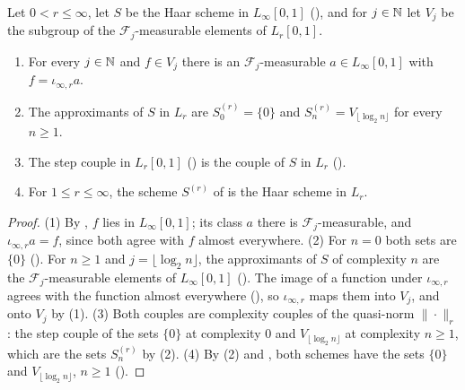 \begin{lemma}
\label{lem:steps-function-scheme}
\leanok
{}
Let $0 < r \leq \infty$, let $S$ be the Haar scheme in $L_\infty[0, 1]$
(), and for $j \in \mathbb{N}$ let $V_j$ be the subgroup of the
$\mathcal{F}_j$-measurable elements of $L_r[0, 1]$.
\begin{enumerate}
  \item For every $j \in \mathbb{N}$ and $f \in V_j$ there is an $\mathcal{F}_j$-measurable
    $a \in L_\infty[0, 1]$ with $f = \iota_{\infty,r} a$.
  \item The approximants of $S$ in $L_r$ are $S^{(r)}_0 = \{0\}$ and
    $S^{(r)}_n = V_{\lfloor \log_2 n \rfloor}$ for every $n \geq 1$.
  \item The step couple in $L_r[0, 1]$ () is the couple of $S$ in $L_r$
    ().
  \item For $1 \leq r \leq \infty$, the scheme $S^{(r)}$ of  is the
    Haar scheme in $L_r$.
\end{enumerate}
\end{lemma}

\begin{proof}
\leanok
{}
(1) By , $f$ lies in $L_\infty[0, 1]$; its class $a$ there is
$\mathcal{F}_j$-measurable, and $\iota_{\infty,r} a = f$, since both agree with $f$ almost
everywhere. (2) For $n = 0$ both sets are $\{0\}$ (). For
$n \geq 1$ and $j = \lfloor \log_2 n \rfloor$, the approximants of $S$ of complexity $n$ are the
$\mathcal{F}_j$-measurable elements of $L_\infty[0, 1]$ (). The
image of a function under $\iota_{\infty,r}$ agrees with the function almost everywhere
(), so $\iota_{\infty,r}$ maps them into $V_j$, and onto $V_j$ by (1).
(3) Both couples are complexity couples of the quasi-norm $\|\cdot\|_r$: the step couple of the
sets $\{0\}$ at complexity $0$ and $V_{\lfloor \log_2 n \rfloor}$ at complexity $n \geq 1$, which
are the sets $S^{(r)}_n$ by (2). (4) By (2) and , both schemes have
the sets $\{0\}$ and $V_{\lfloor \log_2 n \rfloor}$, $n \geq 1$ ().
\end{proof}

